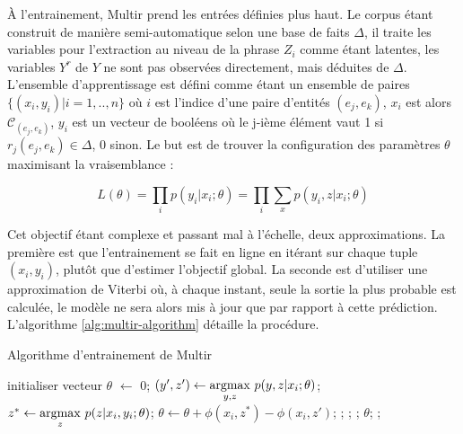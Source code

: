 \documentclass[PhD-Yoann-Dupont.tex]{subfiles}
\begin{document}
À l'entrainement, Multir prend les entrées définies plus haut. Le corpus étant construit de manière semi-automatique selon une base de faits $\Delta$, il traite les variables pour l'extraction au niveau de la phrase $Z_{i}$ comme étant latentes, les variables $Y^{r}$ de $Y$ ne sont pas observées directement, mais déduites de $\Delta$. L'ensemble d'apprentissage est défini comme étant un ensemble de paires $\{(x_{i},y_{i}) | i = 1,..,n\}$ où $i$ est l'indice d'une paire d'entités $(e_{j},e_{k})$, $x_{i}$ est alors $\mathcal{C}_{(e_{j},e_{k})}$, $y_{i}$ est un vecteur de booléens où le j-ième élément vaut 1 si $r_{j}(e_{j},e_{k}) \in \Delta$, 0 sinon. Le but est de trouver la configuration des paramètres $\theta$ maximisant la vraisemblance :

\begin{equation} \label{eq:multir-likelihood}
L(\theta) = \prod_{i} p(y_{i}|x_{i};\theta) = \prod_{i} \sum_{x} p(y_{i},z|x_{i};\theta)
\end{equation}

Cet objectif étant complexe et passant mal à l'échelle, deux approximations. La première est que l'entrainement se fait en ligne en itérant sur chaque tuple $(x_{i},y_{i})$, plutôt que d'estimer l'objectif global. La seconde est d'utiliser une approximation de Viterbi où, à chaque instant, seule la sortie la plus probable est calculée, le modèle ne sera alors mis à jour que par rapport à cette prédiction. L'algorithme \ref{alg:multir-algorithm} détaille la procédure.

\begin{algorithm}[ht!]
\caption{Algorithme d'entrainement de Multir}
\label{alg:multir-algorithm}
\begin{algorithmic}
    \State {}
    \State initialiser vecteur $\theta$ $\gets$ 0;
            \State $(y',z') \gets \underset{y,z}{\operatorname{argmax}}\ p(y,z | x_{i} ; \theta)$;
                \State $z^{*} \gets \argmax{z}\ p(z|x_{i},y_{i};\theta)$;
                \State $\theta \gets \theta + \phi(x_{i},z^{*}) - \phi(x_{i},z')$;
            \EndIf;
        \EndFor;
    \EndFor;
    \State \Return $\theta$;
    \EndFunction;
\end{algorithmic}
\end{algorithm}
\end{document}
